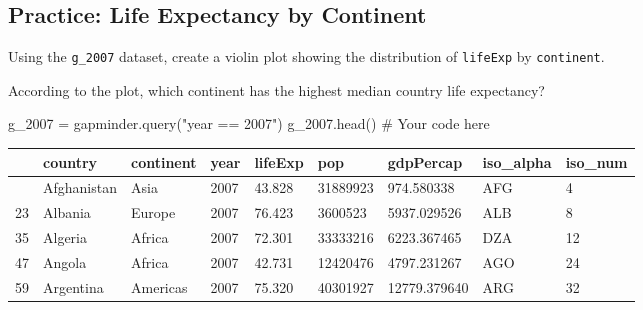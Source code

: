 \documentclass[
  letterpaper,
  DIV=11,
  numbers=noendperiod]{scrreprt}
\newenvironment{Shaded}{\begin{snugshade}}{\end{snugshade}}
\newcommand{\CommentTok}[1]{\textcolor[rgb]{0.37,0.37,0.37}{#1}}
\newcommand{\NormalTok}[1]{\textcolor[rgb]{0.00,0.23,0.31}{#1}}
\newcommand{\OperatorTok}[1]{\textcolor[rgb]{0.37,0.37,0.37}{#1}}
\newcommand{\StringTok}[1]{\textcolor[rgb]{0.13,0.47,0.30}{#1}}
\begin{document}
\begin{tcolorbox}[enhanced jigsaw, colframe=quarto-callout-tip-color-frame, opacityback=0, titlerule=0mm, bottomrule=.15mm, breakable, leftrule=.75mm, colbacktitle=quarto-callout-tip-color!10!white, title=\textcolor{quarto-callout-tip-color}{\faLightbulb}\hspace{0.5em}{Practice}, rightrule=.15mm, coltitle=black, opacitybacktitle=0.6, colback=white, left=2mm, arc=.35mm, toptitle=1mm, bottomtitle=1mm, toprule=.15mm]

\subsection{Practice: Life Expectancy by
Continent}\label{practice-life-expectancy-by-continent}

Using the \texttt{g\_2007} dataset, create a violin plot showing the
distribution of \texttt{lifeExp} by \texttt{continent}.

According to the plot, which continent has the highest median country
life expectancy?

\begin{Shaded}
\begin{Highlighting}[]
\NormalTok{g\_2007 }\OperatorTok{=}\NormalTok{ gapminder.query(}\StringTok{"year == 2007"}\NormalTok{)}
\NormalTok{g\_2007.head()}
\CommentTok{\# Your code here}
\end{Highlighting}
\end{Shaded}

\begin{longtable}[]{@{}lllllllll@{}}
\toprule\noalign{}
& country & continent & year & lifeExp & pop & gdpPercap & iso\_alpha &
iso\_num \\
\midrule\noalign{}
\endhead
\bottomrule\noalign{}
\endlastfoot
11 & Afghanistan & Asia & 2007 & 43.828 & 31889923 & 974.580338 & AFG &
4 \\
23 & Albania & Europe & 2007 & 76.423 & 3600523 & 5937.029526 & ALB &
8 \\
35 & Algeria & Africa & 2007 & 72.301 & 33333216 & 6223.367465 & DZA &
12 \\
47 & Angola & Africa & 2007 & 42.731 & 12420476 & 4797.231267 & AGO &
24 \\
59 & Argentina & Americas & 2007 & 75.320 & 40301927 & 12779.379640 &
ARG & 32 \\
\end{longtable}

\end{tcolorbox}
\end{document}
